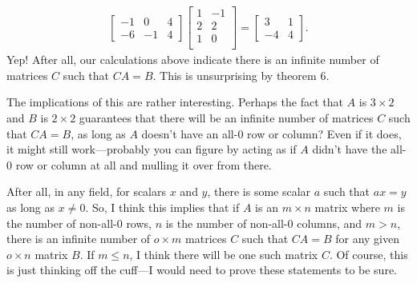 \documentclass[12pt]{article}
\begin{document}
\begin{enumerate}
\begin{align*}
\begin{bmatrix}
        -1 &  0 & 4\\
        -6 & -1 & 4
      \end{bmatrix}
      \begin{bmatrix}
        1 & -1\\
        2 &  2\\
        1 &  0\\
      \end{bmatrix}
      =
      \begin{bmatrix}
        3  & 1\\
        -4 & 4
      \end{bmatrix}.
    \end{align*}
    Yep! After all, our calculations above indicate there is an
    infinite number of matrices $C$ such that $CA = B$. This is
    unsurprising by theorem 6.

    The implications of this are rather interesting. Perhaps the
    fact that $A$ is $3 \times 2$ and $B$ is $2 \times 2$
    guarantees that there will be an infinite number of matrices
    $C$ such that $CA = B$, as long as $A$ doesn't have an all-0
    row or column? Even if it does, it might still work—probably
    you can figure by acting as if $A$ didn't have the all-0 row
    or column at all and mulling it over from there.

    After all, in any field, for scalars $x$ and $y$, there is
    some scalar $a$ such that $ax = y$ as long as $x \neq 0$. So,
    I think this implies that if $A$ is an $m \times n$ matrix
    where $m$ is the number of non-all-0 rows, $n$ is the number
    of non-all-0 columns, and $m > n$, there is an infinite
    number of $o \times m$ matrices $C$ such that $CA = B$ for
    any given $o \times n$ matrix $B$. If $m \leq n$, I think
    there will be one such matrix $C$. Of course, this is just
    thinking off the cuff—I would need to prove these statements
    to be sure.
\end{enumerate}
\end{document}
